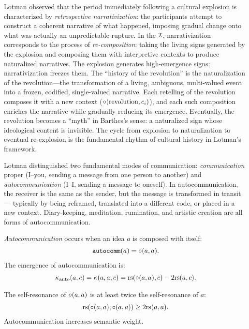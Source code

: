 \begin{remark}
Lotman observed that the period immediately following a cultural explosion is characterized by \emph{retrospective narrativization}: the participants attempt to construct a coherent narrative of what happened, imposing gradual change onto what was actually an unpredictable rupture. In the $\mathcal{I}$, narrativization corresponds to the process of \emph{re-composition}: taking the living signs generated by the explosion and composing them with interpretive contexts to produce naturalized narratives. The explosion generates high-emergence signs; narrativization freezes them. The ``history of the revolution'' is the naturalization of the revolution---the transformation of a living, ambiguous, multi-valued event into a frozen, codified, single-valued narrative. Each retelling of the revolution composes it with a new context ($\circ(\text{revolution}, c_i)$), and each such composition enriches the narrative while gradually reducing its emergence. Eventually, the revolution becomes a ``myth'' in Barthes's sense: a naturalized sign whose ideological content is invisible. The cycle from explosion to naturalization to eventual re-explosion is the fundamental rhythm of cultural history in Lotman's framework.
\end{remark}

Lotman distinguished two fundamental modes of communication:
\emph{communication} proper (I--you, sending a message from one
person to another) and \emph{autocommunication} (I--I, sending a
message to oneself). In autocommunication, the receiver is the same as
the sender, but the message is transformed in transit --- typically by
being reframed, translated into a different code, or placed in a new
context. Diary-keeping, meditation, rumination, and artistic creation
are all forms of autocommunication.

\begin{definition}[Autocommunication]
\label{def:autocomm}
\emph{Autocommunication} occurs when an idea $a$ is composed with
itself:
\[
  \texttt{autocomm}(a) = \circ(a, a).
\]
The emergence of autocommunication is:
\[
  \kappa_{\text{auto}}(a, c) = \kappa(a, a, c) =
  \mathrm{rs}(\circ(a, a), c) - 2\mathrm{rs}(a, c).
\]
\end{definition}

\begin{theorem}
\label{thm:autocomm-enriches}
The self-resonance of $\circ(a, a)$ is at least twice the
self-resonance of $a$:
\[
  \mathrm{rs}(\circ(a, a), \circ(a, a)) \geq 2\mathrm{rs}(a, a).
\]
Autocommunication increases semantic weight.
\end{theorem}

